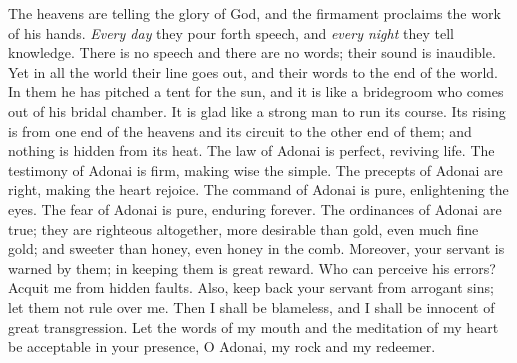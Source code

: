 \begin{biblechapter} %
 The heavens are telling the glory of God, 
and the firmament proclaims the work of his hands.
\verse \textit{Every day} they pour forth speech, 
and \textit{every night} they tell knowledge.
\verse There is no speech and there are no words; 
their sound is inaudible.
\verse Yet in all the world their line goes out, 
and their words to the end of the world. 
In them he has pitched a tent for the sun,
\verse and it is like a bridegroom 
who comes out of his bridal chamber. 
It is glad like a strong man 
to run its course.
\verse Its rising is from one end of the heavens 
and its circuit to the other end of them; 
and nothing is hidden from its heat.
\verse The law of Adonai is perfect, reviving life. 
The testimony of Adonai is firm, making wise the simple.
\verse The precepts of Adonai are right, making the heart rejoice. 
The command of Adonai is pure, enlightening the eyes.
\verse The fear of Adonai is pure, enduring forever. 
The ordinances of Adonai are true; they are righteous altogether,
\verse more desirable than gold, even much fine gold; 
and sweeter than honey, even honey in the comb.
\verse Moreover, your servant is warned by them; 
in keeping them is great reward.
\verse Who can perceive his errors? 
Acquit me from hidden faults.
\verse Also, keep back your servant from arrogant sins; 
let them not rule over me. 
Then I shall be blameless, 
and I shall be innocent of great transgression.
\verse Let the words of my mouth and the meditation of my heart 
be acceptable in your presence, 
O Adonai, my rock and my redeemer.
\end{biblechapter}

